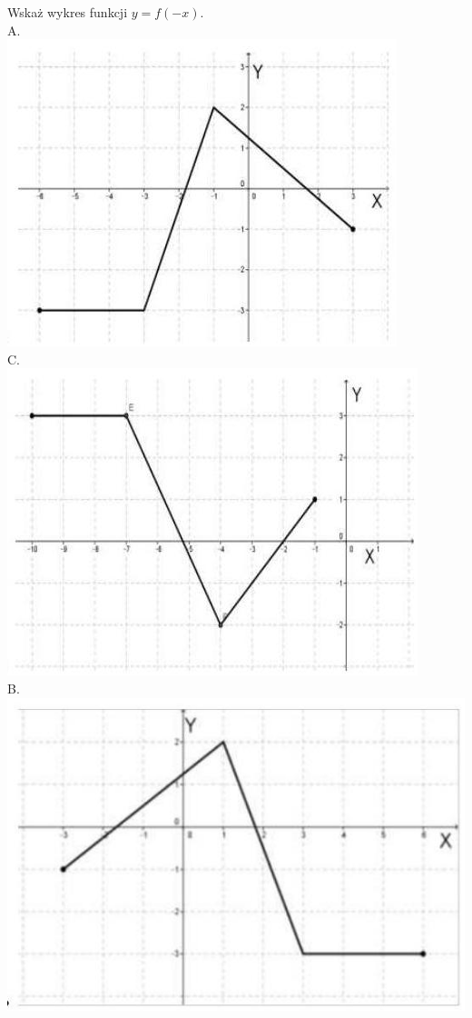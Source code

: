 \documentclass[10pt]{article}
\begin{document}
Wskaż wykres funkcji \(y=f(-x)\).\\
A.\\
\includegraphics[max width=\textwidth, center]{2024_11_21_8e981e1ab2c7e641f462g-02(4)}\\
C.\\
\includegraphics[max width=\textwidth, center]{2024_11_21_8e981e1ab2c7e641f462g-02(2)}\\
B.\\
\includegraphics[max width=\textwidth, center]{2024_11_21_8e981e1ab2c7e641f462g-02(1)}\\
\end{document}
